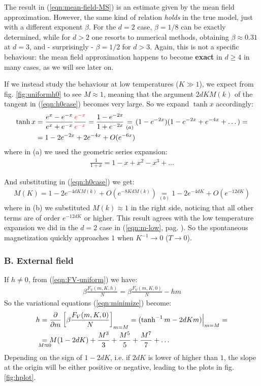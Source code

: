 \documentclass[../../main.tex]{subfiles}
\begin{document}
The result in (\ref{eqn:mean-field-MS}) is an estimate given by the mean field approximation. However, the same kind of relation \textit{holds} in the true model, just with a different exponent $\beta$. For the $d=2$ case, $\beta = 1/8$ can be exactly determined, while for $d > 2$ one resorts to numerical methods, obtaining $\beta \approx 0.31$ at $d=3$, and - surprisingly - $\beta = 1/2$ for $d > 3$. Again, this is not a specific behaviour: the mean field approximation happens to become \textbf{exact} in $d \geq 4$ in many cases, as we will see later on.   

\medskip

If we instead study the behaviour at low temperatures ($K \gg 1$), we expect from fig. \ref{fig:uniformh0} to see $M \approx 1$, meaning that the argument $2dKM(k)$ of the tangent in (\ref{eqn:h0case}) becomes very large. So we expand $\tanh x$ accordingly:
\begin{align*}
    \tanh x &= \frac{e^x - e^{-x}}{e^x + e^{-x}} \frac{\textcolor{Red}{e^{-x}}}{\textcolor{Red}{e^{-x}}} = \frac{1-e^{-2x}}{1+e^{-2x}} \underset{(a)}{=}  (1-e^{-2x})(1-e^{-2x} + e^{-4x} + \dots) =\\
    &= 1 - 2e^{-2x} + 2e^{-4x} + O(e^{-6x})
\end{align*}
where in (a) we used the geometric series expansion:
\begin{align*}
    \frac{1}{1+x} = 1 - x + x^2 - x^3 + \dots
\end{align*}

And substituting in (\ref{eqn:h0case}) we get:
\begin{align}\label{eqn:low-temeperature-var}
    M(K) = 1-2e^{-4dK M(k)} + O(e^{-8KdM(k)}) \underset{(b)}{=}  1-2e^{-4dK} + O(e^{-12dK})
\end{align}
where in (b) we substituted $M(k) \approx 1$ in the right side, noticing that all other terms are of order $e^{-12dK}$ or higher. This result agrees with the low temperature expansion we did in the $d=2$ case in (\ref{eqn:m-low}, pag. \pageref{eqn:m-low}). So the spontaneous magnetization quickly approaches $1$ when $K^{-1} \to 0$ ($T \to 0$).

\subsubsection{B. External field}
If $h\neq 0$, from (\ref{eqn:FV-uniform}) we have:
\begin{align*}
    \beta \frac{F_V(m, K, h)}{N} = \beta \frac{F_V(m,K,0)}{N} - hm  
\end{align*}
So the variational equations (\ref{eqn:minimize}) become:
\begin{align}\label{eqn:var-eq-h}
    h &= \pdv{m}\left[\beta \frac{F_V(m,K,0)}{N} \right]_{m=M} = (\tanh^{-1} m - 2dKm)\Big|_{m=M} =\\
      &\underset{\mathclap{M \approx 0}}{=}  M(1-2dK) + \frac{M^3}{3} + \frac{M^5}{5} + \frac{M^7}{7} + \dots \nonumber
\end{align}
Depending on the sign of $1-2dK$, i.e. if $2dK$ is lower of higher than $1$, the slope at the origin will be either positive or negative, leading to the plots in fig. \ref{fig:hplot}.
\end{document}
